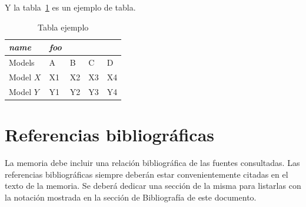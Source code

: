 Y la tabla~\ref{tab:ejemplo2} es un ejemplo de tabla.
\begin{table}[]
    \centering
\begin{tabular}{@{} *5l @{}}    \toprule
\emph{name} & \emph{foo} &&&  \\\midrule
Models    & A  & B  & C  & D  \\ 
 Model $X$ & X1 & X2 & X3 & X4\\ 
 Model $Y$ & Y1 & Y2 & Y3 & Y4\\\bottomrule
 \hline
\end{tabular}
    \caption{Tabla ejemplo}
    \label{tab:ejemplo2}
\end{table}

\begin{table}[]
    \centering
{}
    \caption{Otra tabla}
    \label{tab:tablagris}
\end{table}

\section{Referencias bibliográficas}
La memoria debe incluir una relación bibliográfica de las fuentes consultadas. Las referencias bibliográficas siempre deberán estar convenientemente citadas en el texto de la memoria. Se deberá dedicar una sección de la misma para listarlas con la notación mostrada en la sección de Bibliografía de este documento.

